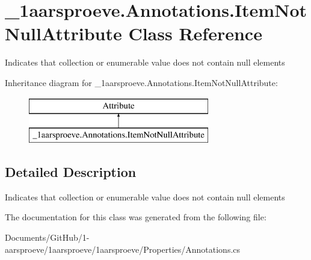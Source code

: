 \hypertarget{class__1aarsproeve_1_1_annotations_1_1_item_not_null_attribute}{}\section{\+\_\+1aarsproeve.\+Annotations.\+Item\+Not\+Null\+Attribute Class Reference}
\label{class__1aarsproeve_1_1_annotations_1_1_item_not_null_attribute}


Indicates that collection or enumerable value does not contain null elements  


Inheritance diagram for \+\_\+1aarsproeve.\+Annotations.\+Item\+Not\+Null\+Attribute\+:\begin{figure}[H]
\begin{center}
\leavevmode
\includegraphics[height=2.000000cm]{class__1aarsproeve_1_1_annotations_1_1_item_not_null_attribute}
\end{center}
\end{figure}


\subsection{Detailed Description}
Indicates that collection or enumerable value does not contain null elements 



The documentation for this class was generated from the following file\+:\begin{DoxyCompactItemize}
\item 
Documents/\+Git\+Hub/1-\/aarsproeve/1aarsproeve/1aarsproeve/\+Properties/Annotations.\+cs\end{DoxyCompactItemize}
